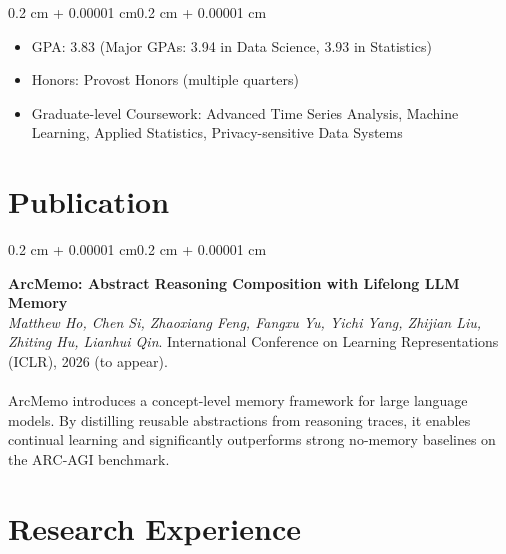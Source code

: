 \documentclass[10pt, letterpaper]{article}
\newenvironment{highlights}{
    \begin{itemize}[
        topsep=0.10 cm,
        parsep=0.10 cm,
        partopsep=0pt,
        itemsep=0pt,
        leftmargin=0.4 cm + 10pt
    ]
}{\end{itemize}}
\newenvironment{onecolentry}{
    \begin{adjustwidth}{0.2 cm + 0.00001 cm}{0.2 cm + 0.00001 cm}
}{\end{adjustwidth}}
\let\hrefWithoutArrow\href
\renewcommand{\href}[2]{\hrefWithoutArrow{#1}{\ifthenelse{\equal{#2}{}}{ }{#2}}}
\begin{document}
    \vspace{0.10 cm}
    \begin{onecolentry}
        \begin{highlights}
            \item GPA: 3.83 (Major GPAs: 3.94 in Data Science, 3.93 in Statistics)
            \item Honors: Provost Honors (multiple quarters)
            \item Graduate-level Coursework: Advanced Time Series Analysis, Machine Learning, Applied Statistics, Privacy-sensitive Data Systems
        \end{highlights}
    \end{onecolentry}

    \section{Publication}

    \begin{onecolentry}
        \textbf{ArcMemo: Abstract Reasoning Composition with Lifelong LLM Memory}\\
        \textit{Matthew Ho, Chen Si, Zhaoxiang Feng, Fangxu Yu, Yichi Yang, Zhijian Liu, Zhiting Hu, Lianhui Qin}. International Conference on Learning Representations (ICLR), 2026 (to appear).\\
        \href{https://arxiv.org/abs/2509.04439}{Paper}\\
        ArcMemo introduces a concept-level memory framework for large language models. By distilling reusable abstractions from reasoning traces, it enables continual learning and significantly outperforms strong no-memory baselines on the ARC-AGI benchmark.
    \end{onecolentry}

    \section{Research Experience}
\end{document}
